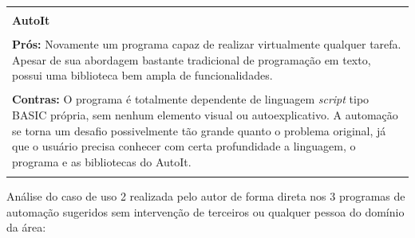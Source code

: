 \documentclass[tg]{mdtufsm}
\begin{document}
{                    \begin{tabular}{ | m{15.6cm} | }
                		\hline \\
                		{\bf AutoIt} \\ \\
                		{\bf Prós:}
                            Novamente um programa capaz de realizar virtualmente qualquer tarefa. Apesar de sua abordagem bastante tradicional de programação em texto, possui uma biblioteca bem ampla de funcionalidades.\\ \\
                		{\bf Contras:}
                            O programa é totalmente dependente de linguagem \emph{script} tipo BASIC própria, sem nenhum elemento visual ou autoexplicativo. A automação se torna um desafio possivelmente tão grande quanto o problema original, já que o usuário precisa conhecer com certa profundidade a linguagem, o programa e as bibliotecas do AutoIt. \\ \\                		\hline
        	       \end{tabular}
                }

            	\bigskip
            	Análise do caso de uso 2 realizada pelo autor de forma direta nos 3 programas de automação sugeridos sem intervenção de terceiros ou qualquer pessoa do domínio da área:
            	\bigskip
\end{document}
